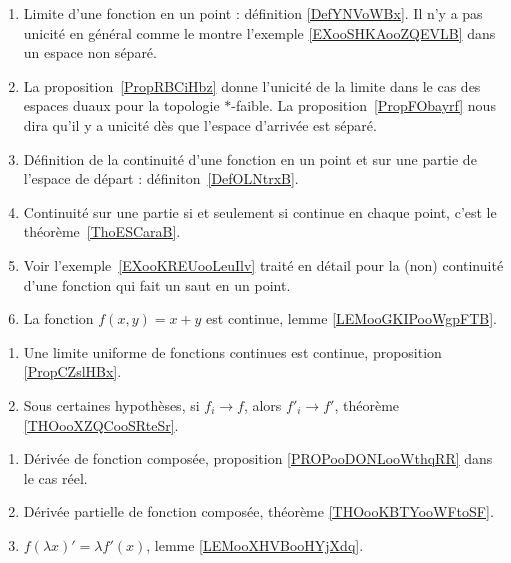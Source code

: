 \begin{enumerate}
    \item
        Limite d'une fonction en un point : définition \ref{DefYNVoWBx}. Il n'y a pas unicité en général comme le montre l'exemple \ref{EXooSHKAooZQEVLB} dans un espace non séparé.
    \item
        La proposition~\ref{PropRBCiHbz} donne l'unicité de la limite dans le cas des espaces duaux pour la topologie \( *\)-faible. La proposition~\ref{PropFObayrf} nous dira qu'il y a unicité dès que l'espace d'arrivée est séparé.
    \item
        Définition de la continuité d'une fonction en un point et sur une partie de l'espace de départ : définiton~\ref{DefOLNtrxB}.
    \item
        Continuité sur une partie si et seulement si continue en chaque point, c'est le théorème~\ref{ThoESCaraB}.
    \item
        Voir l'exemple~\ref{EXooKREUooLeuIlv} traité en détail pour la (non) continuité d'une fonction qui fait un saut en un point.
    \item
        La fonction \( f(x,y)=x+y\) est continue, lemme \ref{LEMooGKIPooWgpFTB}.
\end{enumerate}

\begin{enumerate}
    \item
        Une limite uniforme de fonctions continues est continue, proposition \ref{PropCZslHBx}.
    \item
        Sous certaines hypothèses, si \( f_i\to f\), alors \( f'_i\to f'\), théorème \ref{THOooXZQCooSRteSr}.
\end{enumerate}

\begin{enumerate}
    \item
        Dérivée de fonction composée, proposition \ref{PROPooDONLooWthqRR} dans le cas réel.
    \item
        Dérivée partielle de fonction composée, théorème \ref{THOooKBTYooWFtoSF}.
    \item
        \( f(\lambda x)'=\lambda f'(x)\), lemme \ref{LEMooXHVBooHYjXdq}.
\end{enumerate}

